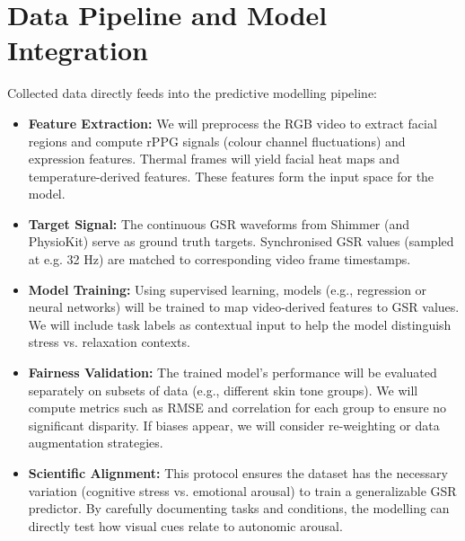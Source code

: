 \documentclass{article}
\begin{document}
\section{Data Pipeline and Model Integration}
Collected data directly feeds into the predictive modelling pipeline:
\begin{itemize}
    \item \textbf{Feature Extraction:} We will preprocess the RGB video to extract facial regions and compute rPPG signals (colour channel fluctuations) and expression features. Thermal frames will yield facial heat maps and temperature-derived features. These features form the input space for the model.
    \item \textbf{Target Signal:} The continuous GSR waveforms from Shimmer (and PhysioKit) serve as ground truth targets. Synchronised GSR values (sampled at e.g. 32 Hz) are matched to corresponding video frame timestamps.
    \item \textbf{Model Training:} Using supervised learning, models (e.g., regression or neural networks) will be trained to map video-derived features to GSR values. We will include task labels as contextual input to help the model distinguish stress vs. relaxation contexts.
    \item \textbf{Fairness Validation:} The trained model’s performance will be evaluated separately on subsets of data (e.g., different skin tone groups). We will compute metrics such as RMSE and correlation for each group to ensure no significant disparity. If biases appear, we will consider re-weighting or data augmentation strategies.
    \item \textbf{Scientific Alignment:} This protocol ensures the dataset has the necessary variation (cognitive stress vs. emotional arousal) to train a generalizable GSR predictor. By carefully documenting tasks and conditions, the modelling can directly test how visual cues relate to autonomic arousal.
\end{itemize}
\end{document}
